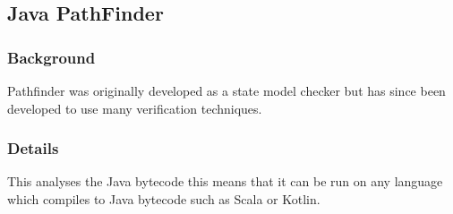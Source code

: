 \documentclass[a4paper,12pt]{scrartcl}
\begin{document}
{		\subsection{Java PathFinder}
		{
			\subsubsection{Background}
			{
				Pathfinder was originally developed as a state model checker but has since been developed to use many verification techniques\cite{Mehlitz2013}. 
			}
			\subsubsection{Details}
			{
				This analyses the Java bytecode this means that it can be run on any language which compiles to Java bytecode such as Scala or Kotlin.
			}
		}
		
	}
	
\end{document}
